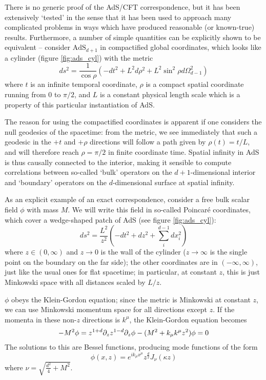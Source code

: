 There is no generic proof of the AdS/CFT correspondence, but it has been 
extensively `tested' in the sense that it has been used to approach many 
complicated problems in ways which have produced reasonable (or known-true) 
results\cite{Polchinski:TASI}. Furthermore, a number of simple quantities can be
explicitly shown to be equivalent -- consider $\mathrm{AdS}_{d+1}$ in 
compactified global coordinates, which looks like a cylinder (figure 
\ref{fig:ads_cyl}) with the metric
\begin{equation}
    ds^2 = \frac{1}{\cos\rho} \left( -dt^2 + L^2 d\rho^2 + L^2 \sin^2\rho 
                                     d\Omega^2_{d-1} \right)
\end{equation}
where $t$ is an infinite temporal coordinate, $\rho$ is a compact spatial 
coordinate running from $0$ to $\pi/2$, and $L$ is a constant physical length 
scale which is a property of this particular instantiation of AdS.

The reason for using the compactified coordinates is apparent if one considers
the null geodesics of the spacetime: from the metric, we see immediately that 
such a geodesic in the $+t$ and $+\rho$ directions will follow a path given by 
$\rho(t) = t/L$, and will therefore reach $\rho = \pi/2$ in finite coordinate 
time. Spatial infinity in AdS is thus causally connected to the interior, making
it sensible to compute correlations between so-called `bulk' operators on the
$d+1$-dimensional interior and `boundary' operators on the $d$-dimensional 
surface at spatial infinity.

As an explicit example of an exact correspondence, consider a free bulk scalar 
field $\phi$ with mass $M$. We will write this field in so-called Poincar\'e
coordinates, which cover a wedge-shaped patch of AdS (see figure 
\ref{fig:ads_cyl}):
\begin{equation}
    ds^2 = \frac{L^2}{z^2} \left( -dt^2 + dz^2 + \sum_i^{d-1} dx_i^2 \right)
\end{equation}
where $z \in (0, \infty)$ and $z \to 0$ is the wall of the cylinder 
($z \to \infty$ is the single point on the boundary on the far side); the other
coordinates are in $(-\infty, \infty)$, just like the usual ones for flat 
spacetime; in particular, at constant $z$, this is just Minkowski space with all
distances scaled by $L/z$.

$\phi$ obeys the Klein-Gordon equation; since the metric is Minkowski at 
constant $z$, we can use Minkowski momentum space for all directions except $z$.
If the momenta in these non-$z$ directions is $k^\mu$, the Klein-Gordon equation
becomes
\begin{equation}
    \box \phi - M^2 \phi = z^{1+d} \partial_z z^{1-d} \partial_z \phi 
                         - (M^2 + k_\mu k^\mu z^2) \phi = 0
\end{equation}
The solutions to this are Bessel functions, producing mode functions of the form
\begin{equation}
    \phi(x, z) = e^{i k_\mu x^\mu} z^\frac{d}{2} J_\nu (\kappa z)
\end{equation}
where $\nu = \sqrt{\frac{d^2}{4} + M^2}$.

